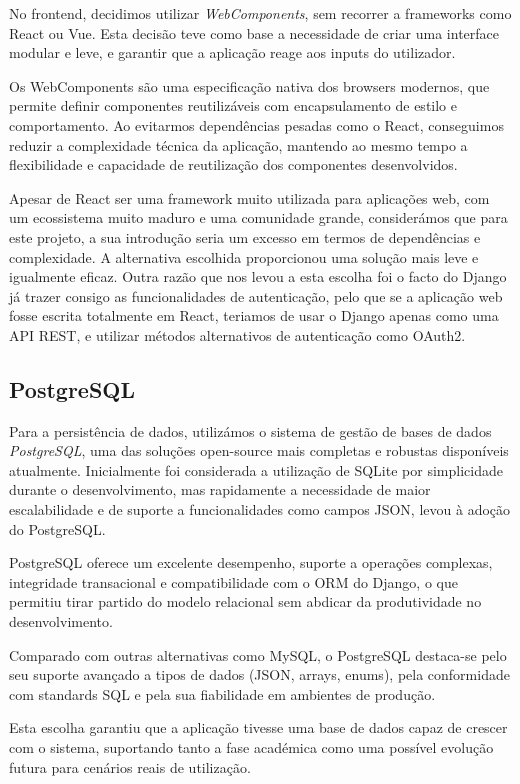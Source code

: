 No frontend, decidimos utilizar \textit{WebComponents}, sem recorrer a frameworks como React ou Vue. Esta decisão teve como base a necessidade de criar uma interface modular e leve, e garantir que a aplicação reage aos inputs do utilizador.

Os WebComponents são uma especificação nativa dos browsers modernos, que permite definir componentes reutilizáveis com encapsulamento de estilo e comportamento. Ao evitarmos dependências pesadas como o React, conseguimos reduzir a complexidade técnica da aplicação, mantendo ao mesmo tempo a flexibilidade e capacidade de reutilização dos componentes desenvolvidos.

Apesar de React ser uma framework muito utilizada para aplicações web,  com um ecossistema muito maduro e uma comunidade grande, considerámos que para este projeto, a sua introdução seria um excesso em termos de dependências e complexidade. A alternativa escolhida proporcionou uma solução mais leve e igualmente eficaz. Outra razão que nos levou a esta escolha foi o facto do Django já trazer consigo as funcionalidades de autenticação, pelo que se a aplicação web fosse escrita totalmente em React, teriamos de usar o Django apenas como uma API REST, e utilizar métodos alternativos de autenticação como OAuth2.

\subsection{PostgreSQL}

Para a persistência de dados, utilizámos o sistema de gestão de bases de dados \textit{PostgreSQL}, uma das soluções open-source mais completas e robustas disponíveis atualmente. Inicialmente foi considerada a utilização de SQLite por simplicidade durante o desenvolvimento, mas rapidamente a necessidade de maior escalabilidade e de suporte a funcionalidades como campos JSON, levou à adoção do PostgreSQL.

PostgreSQL oferece um excelente desempenho, suporte a operações complexas, integridade transacional e compatibilidade com o ORM do Django, o que permitiu tirar partido do modelo relacional sem abdicar da produtividade no desenvolvimento.

Comparado com outras alternativas como MySQL, o PostgreSQL destaca-se pelo seu suporte avançado a tipos de dados (JSON, arrays, enums), pela conformidade com standards SQL e pela sua fiabilidade em ambientes de produção.

Esta escolha garantiu que a aplicação tivesse uma base de dados capaz de crescer com o sistema, suportando tanto a fase académica como uma possível evolução futura para cenários reais de utilização.

